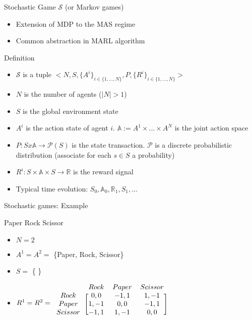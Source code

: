 \documentclass[presentation]{beamer}\mode<presentation>{\usetheme{AMSBolognaFC}}
\begin{document}
\begin{frame}[c]{Stochastic Game $\mathcal{S}$ (or Markov games)}
	\begin{alertblock}{}
		\begin{itemize}
			\item Extension of MDP to the MAS regime
			\item Common abstraction in MARL algorithm
		\end{itemize}
	\end{alertblock}
	\begin{alertblock}{Definition}
		\begin{itemize}
			\item $\mathcal{S}$ is a tuple $<N, S, \{A^i\}_{i \in \{ 1, ..., N\}}, P, \{R^i\}_{i \in \{ 1, ..., N\}}>$
			\item $N$ is the number of agents ($|N| > 1 $)
			\item $S$ is the global environment state
			\item $A^i$ is the action state of agent $i$. $\mathbb{A} := A^1 \times ...\times A^N$ is the joint action space
			\item $P: S x \mathbb{A} \rightarrow \mathcal{P}(S)$ is the state transaction. $\mathcal{P}$ is a discrete probabilistic distribution (associate for each $s \in S$ a probability)
			\item $R^i: S \times \mathbb{A} \times S \rightarrow \mathbb{R}$ is the reward signal
			\item Typical time evolution: $ S_0, \mathbb{A}_0, \mathbb{R}_1, S_1, ...  $
		\end{itemize}
	\end{alertblock}
\end{frame}
\begin{frame}[fragile]{Stochastic games: Example}
	\begin{exampleblock}{Paper Rock Scissor}
		\begin{itemize}
			\item $N = 2$
			\item $A^1 = A^2 = $ \{Paper, Rock, Scissor\}
			\item $S = $ \{ \}
			\item $R^1 = R^2 = \begin{blockarray}{cccc}
        & Rock & Paper & Scissor \\
      \begin{block}{c[ccc]}
        Rock    & 0, 0  & -1, 1 & 1, -1 \\
        Paper   & 1, -1 & 0, 0  & -1, 1 \\
        Scissor & -1, 1 & 1, -1 & 0, 0 \\
      \end{block}
    \end{blockarray}$
		\end{itemize}
	\end{exampleblock}
\end{frame}
\end{document}

